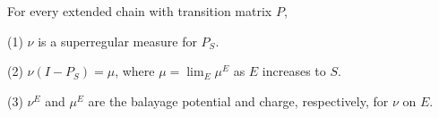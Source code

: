 For every extended chain with transition matrix $P$,

(1) $\nu$ is a superregular measure for $P_S$.

(2) $\nu(I - P_S) = \mu$, where $\mu = \lim_E \mu^E$ as $E$ increases to $S$.

(3) $\nu^E$ and $\mu^E$ are the balayage potential and charge, respectively, for $\nu$ on $E$.
